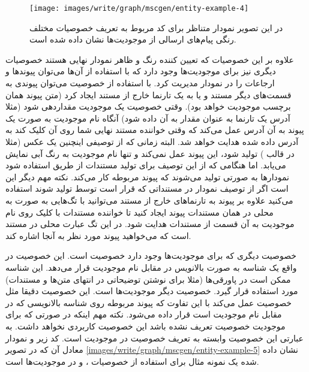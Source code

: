 
\begin{figure}[h]
	\centering
	\texttt{[image: images/write/graph/mscgen/entity-example-4]}
	\caption[مثالی از نحوه تعریف خصوصیات مختلف موجودیت‌ها برای کنترل پیام‌های یک
	موجودیت]
	{در این تصویر نمودار متناظر برای کد مربوط به تعریف خصوصیات
	مختلف رنگی پیام‌های ارسالی از موجودیت‌ها نشان داده شده است.}
	\label{images/write/graph/mscgen/entity-example-4}
\end{figure}

علاوه بر این خصوصیات که تعیین کننده رنگ و ظاهر نمودار نهایی هستند خصوصیات دیگری
نیز برای موجودیت‌ها وجود دارد که با استفاده از آن‌ها می‌توان پیوندها و ارجاعات
را در نمودار مدیریت کرد. با استفاده از خصوصیت  می‌توان پیوندی به
قسمت‌های دیگر مستند و یا به یک تارنما خارج از مستند ایجاد کرد (متن پیوند همان
برچسب موجودیت خواهد بود). وقتی خصوصیت  یک موجودیت مقداردهی شود (مثلا
آدرس یک تارنما به عنوان مقدار به آن داده شود) آنگاه نام موجودیت به صورت یک پیوند
به آن آدرس عمل می‌کند که وقتی خواننده مستند نهایی شما روی آن کلیک کند به آدرس
داده شده هدایت خواهد شد. البته زمانی که از توصیفی اینچنین یک عکس (مثلا در قالب
) تولید شود، این پیوند عمل نمی‌کند و تنها نام موجودیت به رنگ آبی نمایش
می‌یابد. اما هنگامی که از این توصیف برای تولید مستندات از طریق 
استفاده شود نمودارها به صورتی تولید می‌شوند که پیوند مربوطه کار می‌کند. نکته مهم
دیگر این است اگر از توصیف نمودار در مستنداتی که قرار است توسط  تولید
شوند استفاده می‌کنید علاوه بر پیوند به تارنماهای خارج از مستند می‌توانید با
تگ‌‌هایی به صورت  به محلی در همان مستندات پیوند
ایجاد کنید تا خواننده مستندات با کلیک روی نام موجودیت به آن قسمت از مستندات
هدایت شود. در این تگ عبارت  محلی در مستند است که می‌خواهید پیوند مورد
نظر به آنجا اشاره کند.

خصوصیت دیگری که برای موجودیت‌ها وجود دارد خصوصیت  است. این خصوصیت در واقع
یک شناسه به صورت بالانویس در مقابل نام موجودیت قرار می‌دهد.
این شناسه ممکن است در پاورقی‌ها (مثلا برای نوشتن توضیحاتی در انتهای متن‌ها و
مستندات) مورد استفاده قرار گیرد. خصوصیت دیگر موجودیت‌ها  است. این
خصوصیت دقیقا مثل خصوصیت  عمل می‌کند با این تفاوت که پیوند مربوطه روی
شناسه بالانویسی که در مقابل نام موجودیت است قرار داده می‌شود. نکته مهم اینکه در
صورتی که برای موجودیت خصوصیت  تعریف نشده باشد این خصوصیت کاربردی نخواهد
داشت. به عبارتی این خصوصیت وابسته به تعریف خصوصیت  در موجودیت است. کد زیر
و نمودار معادل آن که در تصویر \ref{images/write/graph/mscgen/entity-example-5}
نشان داده شده یک نمونه مثال برای استفاده از خصوصیات ،  و
 در موجودیت‌ها است.

